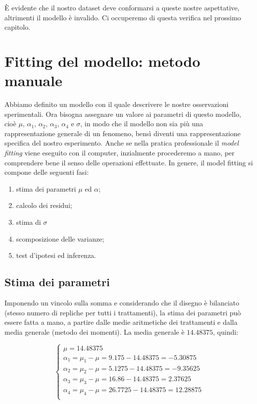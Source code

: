 \documentclass[a4paper,12pt,oneside]{book}
\providecommand{\tightlist}{%
  \setlength{\itemsep}{0pt}\setlength{\parskip}{0pt}}
\begin{document}
È evidente che il nostro dataset deve conformarsi a queste nostre aspettative, altrimenti il modello è invalido. Ci occuperemo di questa verifica nel prossimo capitolo.

\hypertarget{fitting-del-modello-metodo-manuale}{%
\section{Fitting del modello: metodo manuale}\label{fitting-del-modello-metodo-manuale}}

Abbiamo definito un modello con il quale descrivere le nostre osservazioni sperimentali. Ora bisogna assegnare un valore ai parametri di questo modello, cioè \(\mu\), \(\alpha_1\), \(\alpha_2\), \(\alpha_3\), \(\alpha_4\) e \(\sigma\), in modo che il modello non sia più una rappresentazione generale di un fenomeno, bensì diventi una rappresentazione specifica del nostro esperimento. Anche se nella pratica professionale il \emph{model fitting} viene eseguito con il computer, inzialmente procederemo a mano, per comprendere bene il senso delle operazioni effettuate. In genere, il model fitting si compone delle seguenti fasi:

\begin{enumerate}
\def\labelenumi{\arabic{enumi}.}
\tightlist
\item
  stima dei parametri \(\mu\) ed \(\alpha\);
\item
  calcolo dei residui;
\item
  stima di \(\sigma\)
\item
  scomposizione delle varianze;
\item
  test d'ipotesi ed inferenza.
\end{enumerate}

\hypertarget{stima-dei-parametri}{%
\subsection{Stima dei parametri}\label{stima-dei-parametri}}

Imponendo un vincolo sulla somma e considerando che il disegno è bilanciato (stesso numero di repliche per tutti i trattamenti), la stima dei parametri può essere fatta a mano, a partire dalle medie aritmetiche dei trattamenti e dalla media generale (metodo dei momenti). La media generale è \(14.48375\), quindi:

\[ \left\{ {\begin{array}{l}
\mu = 14.48375\\
\alpha_1 = \mu_1 - \mu = 9.175 - 14.48375 =  - 5.30875\\
\alpha_2 = \mu_2 - \mu = 5.1275 - 14.48375 =  - 9.35625\\
\alpha_3 = \mu_3 - \mu = 16.86 - 14.48375 =  2.37625\\
\alpha_4 = \mu_4 - \mu = 26.7725 - 14.48375 =  12.28875\\
\end{array}} \right.\]
\end{document}
